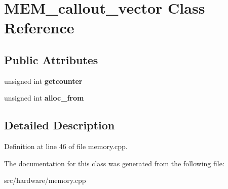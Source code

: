 \hypertarget{classMEM__callout__vector}{\section{M\-E\-M\-\_\-callout\-\_\-vector Class Reference}
\label{classMEM__callout__vector}
}
\subsection*{Public Attributes}
\begin{DoxyCompactItemize}
\item 
\hypertarget{classMEM__callout__vector_ae09b32d7854ef9163df3aa5cd4957956}{unsigned int {\bfseries getcounter}}\label{classMEM__callout__vector_ae09b32d7854ef9163df3aa5cd4957956}

\item 
\hypertarget{classMEM__callout__vector_a92ff2702b55bb31d7d9dc3f9e6ae4dc0}{unsigned int {\bfseries alloc\-\_\-from}}\label{classMEM__callout__vector_a92ff2702b55bb31d7d9dc3f9e6ae4dc0}

\end{DoxyCompactItemize}


\subsection{Detailed Description}


Definition at line 46 of file memory.\-cpp.



The documentation for this class was generated from the following file\-:\begin{DoxyCompactItemize}
\item 
src/hardware/memory.\-cpp\end{DoxyCompactItemize}
